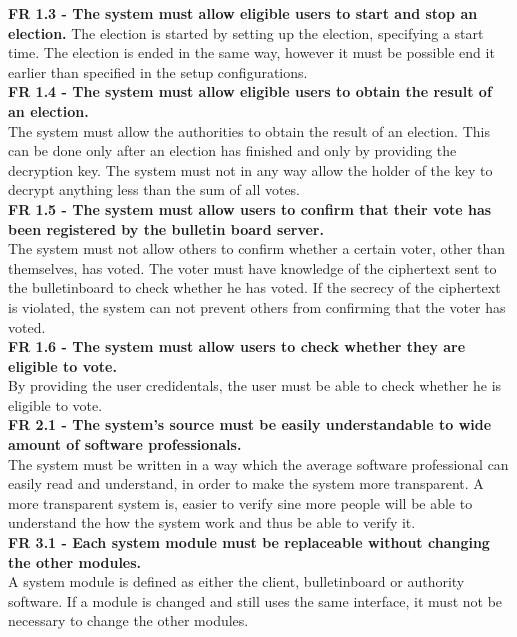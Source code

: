 \textbf{FR 1.3 - The system must allow eligible users to start and stop an election.}
The election is started by setting up the election, specifying a start time. The election is ended in the same way, however it must be possible end it earlier than specified in the setup configurations. \\

\textbf{FR 1.4 - The system must allow eligible users to obtain the result of an election.} \\
The system must allow the authorities to obtain the result of an election. This can be done only after an election has finished and only by providing the decryption key. The system must not in any way allow the holder of the key to decrypt anything less than the sum of all votes. \\

\textbf{FR 1.5 - The system must allow users to confirm that their vote has been registered by the bulletin board server.} \\
The system must not allow others to confirm whether a certain voter, other than themselves, has voted. The voter must have knowledge of the ciphertext sent to the bulletinboard to check whether he has voted. If the secrecy of the ciphertext is violated, the system can not prevent others from confirming that the voter has voted. \\

\textbf{FR 1.6 - The system must allow users to check whether they are eligible to vote.} \\
By providing the user credidentals, the user must be able to check whether he is eligible to vote. \\

\textbf{FR 2.1 - The system's source must be easily understandable to wide amount of software professionals.} \\
The system must be written in a way which the average software professional can easily read and understand, in order to make the system more transparent. A more transparent system is, easier to verify sine more people will be able to understand the how the system work and thus be able to verify it. \\

\textbf{FR 3.1 -  Each system module must be replaceable without changing the other modules.} \\
A system module is defined as either the client, bulletinboard or authority software. If a module is changed and still uses the same interface, it must not be necessary to change the other modules.

